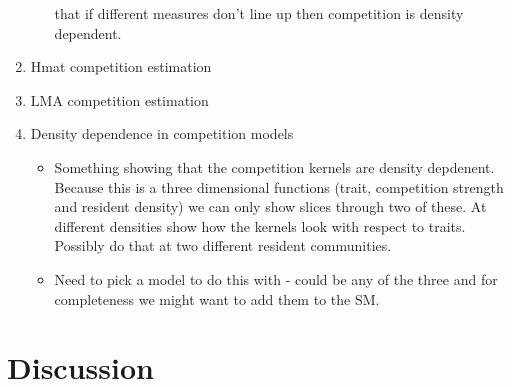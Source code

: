 \documentclass[a4paper,11pt]{article}
\begin{document}
\begin{enumerate}
\begin{itemize}
    that if different measures don't line up then competition is
    density dependent.
  \end{itemize}
\item Hmat competition estimation
\item LMA competition estimation
\item Density dependence in competition models
  \begin{itemize}
  \item Something showing that the competition kernels are density
    depdenent.  Because this is a three dimensional functions (trait,
    competition strength and resident density) we can only show slices
    through two of these.  At different densities show how the
    kernels look with respect to traits.  Possibly do that at two
    different resident communities.
  \item Need to pick a model to do this with - could be any of the
    three and for completeness we might want to add them to the SM.
  \end{itemize}
\end{enumerate}

\clearpage
\section{Discussion}
\end{document}
